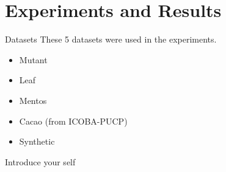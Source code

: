 \documentclass[aspectratio=169]{beamer}
\begin{document}
\section{Experiments and Results}
    \begin{frame}{Datasets}
        These 5 datasets were used in the experiments. \\
        
        \begin{itemize}
            \item Mutant \cite{buettner2017non}
            \item Leaf \cite{gonzalez2023climate}
            \item Mentos \cite{alvarez2024exploratory}
            \item Cacao (from ICOBA-PUCP)
            \item Synthetic
        \end{itemize}


        \begin{note}
            {Introduce your self}
        \end{note}
    \end{frame}

\end{document}
